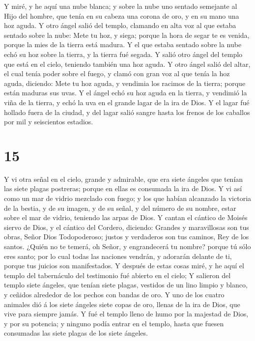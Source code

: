  Y miré, y he aquí una nube blanca; y sobre la nube uno
sentado semejante al Hijo del hombre, que tenía en su cabeza una corona
de oro, y en su mano una hoz aguda.  Y otro ángel salió del
templo, clamando en alta voz al que estaba sentado sobre la nube: Mete
tu hoz, y siega; porque la hora de segar te es venida, porque la mies de
la tierra está madura.  Y el que estaba sentado sobre la
nube echó su hoz sobre la tierra, y la tierra fué segada. 
Y salió otro ángel del templo que está en el cielo, teniendo también una
hoz aguda.  Y otro ángel salió del altar, el cual tenía
poder sobre el fuego, y clamó con gran voz al que tenía la hoz aguda,
diciendo: Mete tu hoz aguda, y vendimia los racimos de la tierra; porque
están maduras sus uvas.  Y el ángel echó su hoz aguda en la
tierra, y vendimió la viña de la tierra, y echó la uva en el grande
lagar de la ira de Dios.  Y el lagar fué hollado fuera de
la ciudad, y del lagar salió sangre hasta los frenos de los caballos por
mil y seiscientos estadios.

\hypertarget{section-14}{%
\section{15}\label{section-14}}

 Y vi otra señal en el cielo, grande y admirable, que era
siete ángeles que tenían las siete plagas postreras; porque en ellas es
consumada la ira de Dios.  Y vi así como un mar de vidrio
mezclado con fuego; y los que habían alcanzado la victoria de la bestia,
y de su imagen, y de su señal, y del número de su nombre, estar sobre el
mar de vidrio, teniendo las arpas de Dios.  Y cantan el
cántico de Moisés siervo de Dios, y el cántico del Cordero, diciendo:
Grandes y maravillosas son tus obras, Señor Dios Todopoderoso; justos y
verdaderos son tus caminos, Rey de los santos.  ¿Quién no te
temerá, oh Señor, y engrandecerá tu nombre? porque tú sólo eres santo;
por lo cual todas las naciones vendrán, y adorarán delante de ti, porque
tus juicios son manifestados.  Y después de estas cosas
miré, y he aquí el templo del tabernáculo del testimonio fué abierto en
el cielo;  Y salieron del templo siete ángeles, que tenían
siete plagas, vestidos de un lino limpio y blanco, y ceñidos alrededor
de los pechos con bandas de oro.  Y uno de los cuatro
animales dió á los siete ángeles siete copas de oro, llenas de la ira de
Dios, que vive para siempre jamás.  Y fué el templo lleno de
humo por la majestad de Dios, y por su potencia; y ninguno podía entrar
en el templo, hasta que fuesen consumadas las siete plagas de los siete
ángeles.

